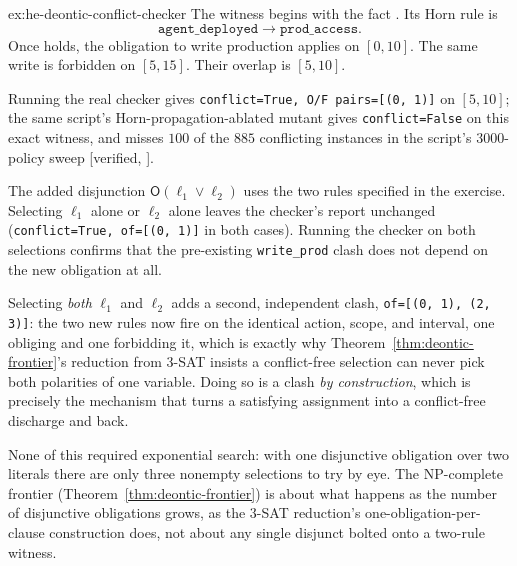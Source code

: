 \documentclass[11pt,a4paper]{article}
\theoremstyle{definition}
\theoremstyle{definition}
\theoremstyle{remark}
\begin{document}
\begin{pdsolution}{ex:he-deontic-conflict-checker}
The witness begins with the fact . Its Horn rule is
\[
\texttt{agent\_deployed}\to\texttt{prod\_access}.
\]
Once  holds, the obligation to write production applies on
$[0,10]$. The same write is forbidden on $[5,15]$. Their overlap is $[5,10]$.

Running the real checker gives \texttt{conflict=True, O/F pairs=[(0, 1)]} on
$[5,10]$; the same script's Horn-propagation-ablated mutant gives
\texttt{conflict=False} on this exact witness, and misses $100$ of the $885$
conflicting instances in the script's $3000$-policy sweep [verified,
].

The added disjunction $\mathsf O(\ell_1\vee\ell_2)$ uses the two rules specified in
the exercise. Selecting $\ell_1$ alone or $\ell_2$ alone leaves the checker's report unchanged
(\texttt{conflict=True, of=[(0, 1)]} in both cases). Running the checker on both
selections confirms that the pre-existing
\texttt{write\_prod} clash does not depend on the new obligation at all.

Selecting \emph{both} $\ell_1$ and
$\ell_2$ adds a second, independent clash, \texttt{of=[(0, 1), (2, 3)]}: the two
new rules now fire on the identical action, scope, and interval, one obliging
and one forbidding it, which is exactly why Theorem~\ref{thm:deontic-frontier}'s reduction from 3-SAT
insists a conflict-free selection can never pick both polarities of one
variable. Doing so is a clash \emph{by construction}, which is precisely the
mechanism that turns a satisfying assignment into a conflict-free discharge and
back.

None of this required exponential search: with one disjunctive obligation
over two literals there are only three nonempty selections to try by eye. The
NP-complete frontier (Theorem~\ref{thm:deontic-frontier}) is about what happens as the number of
disjunctive obligations grows, as the $3$-SAT reduction's one-obligation-per-clause
construction does, not about any single disjunct bolted onto a two-rule
witness.
\end{pdsolution}


\end{document}
